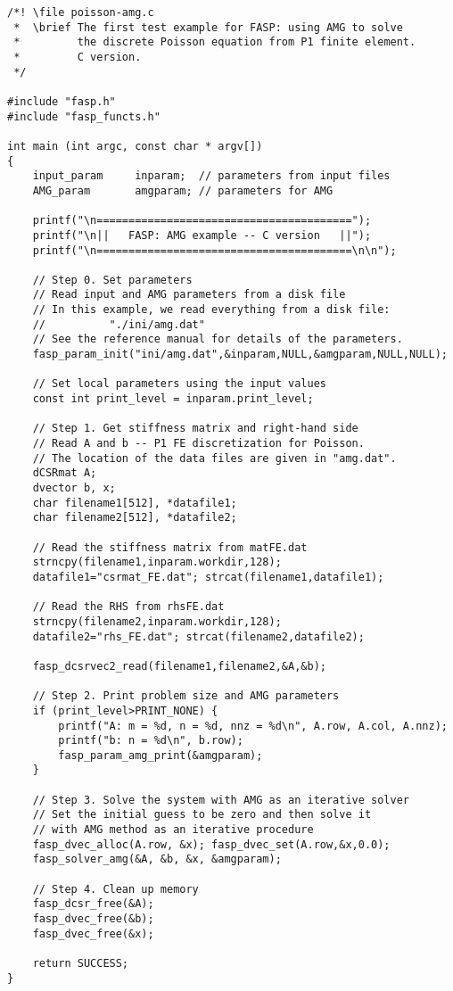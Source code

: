 \documentclass[11pt]{memoir}
\begin{document}
\begin{lstlisting}[stepnumber=1,firstnumber=1]
/*! \file poisson-amg.c
 *  \brief The first test example for FASP: using AMG to solve 
 *         the discrete Poisson equation from P1 finite element.
 *         C version.
 */

#include "fasp.h"
#include "fasp_functs.h"

int main (int argc, const char * argv[]) 
{
    input_param     inparam;  // parameters from input files
    AMG_param       amgparam; // parameters for AMG
    
    printf("\n========================================");
    printf("\n||   FASP: AMG example -- C version   ||");
    printf("\n========================================\n\n");

    // Step 0. Set parameters
    // Read input and AMG parameters from a disk file
    // In this example, we read everything from a disk file:
    //          "./ini/amg.dat"
    // See the reference manual for details of the parameters. 
    fasp_param_init("ini/amg.dat",&inparam,NULL,&amgparam,NULL,NULL);
    
    // Set local parameters using the input values
    const int print_level = inparam.print_level;
    
    // Step 1. Get stiffness matrix and right-hand side
    // Read A and b -- P1 FE discretization for Poisson.
    // The location of the data files are given in "amg.dat".
    dCSRmat A;
    dvector b, x;
    char filename1[512], *datafile1;
    char filename2[512], *datafile2;
	
    // Read the stiffness matrix from matFE.dat
    strncpy(filename1,inparam.workdir,128);    
    datafile1="csrmat_FE.dat"; strcat(filename1,datafile1);
    
    // Read the RHS from rhsFE.dat
    strncpy(filename2,inparam.workdir,128);
    datafile2="rhs_FE.dat"; strcat(filename2,datafile2);
    
    fasp_dcsrvec2_read(filename1,filename2,&A,&b);
    
    // Step 2. Print problem size and AMG parameters
    if (print_level>PRINT_NONE) {
        printf("A: m = %d, n = %d, nnz = %d\n", A.row, A.col, A.nnz);
        printf("b: n = %d\n", b.row);
        fasp_param_amg_print(&amgparam);
    }
    
    // Step 3. Solve the system with AMG as an iterative solver
    // Set the initial guess to be zero and then solve it
    // with AMG method as an iterative procedure
    fasp_dvec_alloc(A.row, &x); fasp_dvec_set(A.row,&x,0.0);
    fasp_solver_amg(&A, &b, &x, &amgparam);
    
    // Step 4. Clean up memory
    fasp_dcsr_free(&A);
    fasp_dvec_free(&b);
    fasp_dvec_free(&x);
    
    return SUCCESS;
}
\end{lstlisting}
\end{document}
